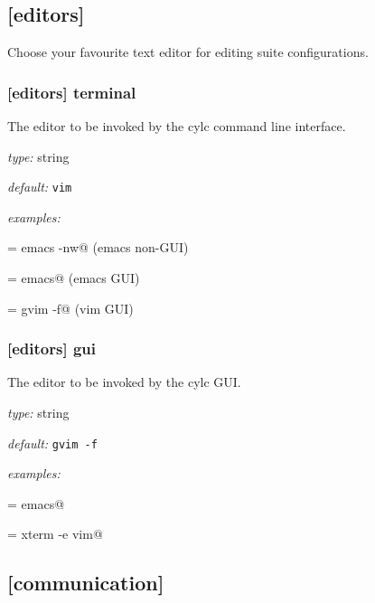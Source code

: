 \subsection{[editors]}

Choose your favourite text editor for editing suite configurations.

\subsubsection[terminal]{[editors] \textrightarrow terminal}

The editor to be invoked by the cylc command line interface.

\begin{myitemize}
\item {\em type:} string
\item {\em default:} \lstinline=vim=
\item {\em examples:}
    \begin{myitemize}
            \item \lstinline@terminal = emacs -nw@ (emacs non-GUI)
            \item \lstinline@terminal = emacs@ (emacs GUI)
            \item \lstinline@terminal = gvim -f@ (vim GUI)
    \end{myitemize}
\end{myitemize}

\subsubsection[gui]{[editors] \textrightarrow gui}

The editor to be invoked by the cylc GUI.

\begin{myitemize}
\item {\em type:} string
\item {\em default:} \lstinline=gvim -f=
\item {\em examples:}
    \begin{myitemize}
            \item \lstinline@gui = emacs@
            \item \lstinline@gui = xterm -e vim@
    \end{myitemize}
\end{myitemize}


\subsection{[communication]}

